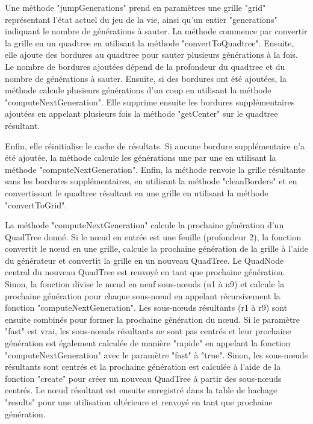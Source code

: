 Une méthode "jumpGenerations" prend en paramètres une grille "grid" représentant l'état actuel du jeu de la vie, ainsi qu'un entier "generations" indiquant le nombre de générations à sauter. La méthode commence par convertir la grille en un quadtree en utilisant la méthode "convertToQuadtree". Ensuite, elle ajoute des bordures au quadtree pour sauter plusieurs générations à la fois. Le nombre de bordures ajoutées dépend de la profondeur du quadtree et du nombre de générations à sauter. Ensuite, si des bordures ont été ajoutées, la méthode calcule plusieurs générations d'un coup en utilisant la méthode "computeNextGeneration". Elle supprime ensuite les bordures supplémentaires ajoutées en appelant plusieurs fois la méthode "getCenter" sur le quadtree résultant.\newline
 
Enfin, elle réinitialise le cache de résultats. Si aucune bordure supplémentaire n'a été ajoutée, la méthode calcule les générations une par une en utilisant la méthode "computeNextGeneration". 
Enfin, la méthode renvoie la grille résultante sans les bordures supplémentaires, en utilisant la méthode "cleanBorders" et en convertissant le quadtree résultant en une grille en utilisant la méthode "convertToGrid".\newline

La méthode "computeNextGeneration" calcule la prochaine génération d'un QuadTree donné. Si le nœud en entrée est une feuille (profondeur 2), la fonction convertit le nœud en une grille, calcule la prochaine génération de la grille à l'aide du générateur et convertit la grille en un nouveau QuadTree. Le QuadNode central du nouveau QuadTree est renvoyé en tant que prochaine génération. Sinon, la fonction divise le nœud en neuf sous-nœuds (n1 à n9) et calcule la prochaine génération pour chaque sous-nœud en appelant récursivement la fonction "computeNextGeneration". Les sous-nœuds résultants (r1 à r9) sont ensuite combinés pour former la prochaine génération du nœud. Si le paramètre "fast" est vrai, les sous-nœuds résultants ne sont pas centrés et leur prochaine génération est également calculée de manière "rapide" en appelant la fonction "computeNextGeneration" avec le paramètre "fast" à "true". Sinon, les sous-nœuds résultants sont centrés et la prochaine génération est calculée à l'aide de la fonction "create" pour créer un nouveau QuadTree à partir des sous-nœuds centrés. Le nœud résultant est ensuite enregistré dans la table de hachage "results" pour une utilisation ultérieure et renvoyé en tant que prochaine génération.\newline 

